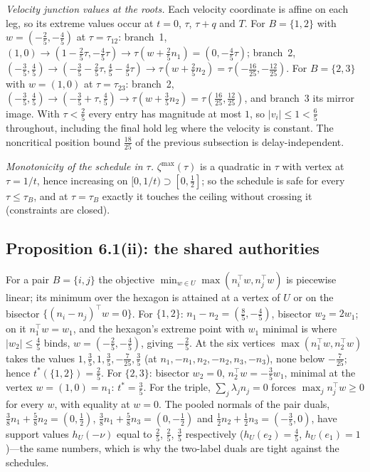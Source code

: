 \documentclass[11pt,a4paper]{article}
\theoremstyle{plain}
\theoremstyle{definition}
\theoremstyle{remark}
\newcommand{\tfr}[2]{\tfrac{#1}{#2}}
\begin{document}
\emph{Velocity junction values at the roots.} Each velocity coordinate is affine on each leg, so its extreme values occur at $t=0$, $\tau$, $\tau+q$ and $T$. For $B=\{1,2\}$ with $w=(-\tfr25,-\tfr45)$ at $\tau=\tau_{12}$: branch~1, $(1,0)\to(1-\tfr25\tau,-\tfr45\tau)\to\tau(w+\tfr25n_1)=(0,-\tfr45\tau)$; branch~2, $(-\tfr35,\tfr45)\to(-\tfr35-\tfr25\tau,\tfr45-\tfr45\tau)\to\tau(w+\tfr25n_2)=\tau(-\tfr{16}{25},-\tfr{12}{25})$. For $B=\{2,3\}$ with $w=(1,0)$ at $\tau=\tau_{23}$: branch~2, $(-\tfr35,\tfr45)\to(-\tfr35+\tau,\tfr45)\to\tau(w+\tfr35n_2)=\tau(\tfr{16}{25},\tfr{12}{25})$, and branch~3 its mirror image. With $\tau<\tfr25$ every entry has magnitude at most $1$, so $|v_i|\le1<\tfr65$ throughout, including the final hold leg where the velocity is constant. The noncritical position bound $\tfr{18}{25}$ of the previous subsection is delay-independent.

\emph{Monotonicity of the schedule in $\tau$.} $\zeta^{\max}(\tau)$ is a quadratic in $\tau$ with vertex at $\tau=1/t$, hence increasing on $[0,1/t)\supset[0,\tfr12]$; so the schedule is safe for every $\tau\le\tau_B$, and at $\tau=\tau_B$ exactly it touches the ceiling without crossing it (constraints are closed).

\subsection{Proposition 6.1(ii): the shared authorities}

For a pair $B=\{i,j\}$ the objective $\min_{w\in U}\max(n_i^\top w,n_j^\top w)$ is piecewise linear; its minimum over the hexagon is attained at a vertex of $U$ or on the bisector $\{(n_i-n_j)^\top w=0\}$. For $\{1,2\}$: $n_1-n_2=(\tfr85,-\tfr45)$, bisector $w_2=2w_1$; on it $n_1^\top w=w_1$, and the hexagon's extreme point with $w_1$ minimal is where $|w_2|\le\tfr45$ binds, $w=(-\tfr25,-\tfr45)$, giving $-\tfr25$. At the six vertices $\max(n_1^\top w,n_2^\top w)$ takes the values $1,\tfr35,1,\tfr35,-\tfr7{25},\tfr35$ (at $n_1,-n_1,n_2,-n_2,n_3,-n_3$), none below $-\tfr7{25}$; hence $t^\ast(\{1,2\})=\tfr25$. For $\{2,3\}$: bisector $w_2=0$, $n_2^\top w=-\tfr35w_1$, minimal at the vertex $w=(1,0)=n_1$: $t^\ast=\tfr35$. For the triple, $\sum_j\lambda_jn_j=0$ forces $\max_jn_j^\top w\ge0$ for every $w$, with equality at $w=0$. The pooled normals of the pair duals, $\tfr38n_1+\tfr58n_2=(0,\tfr12)$, $\tfr38n_1+\tfr58n_3=(0,-\tfr12)$ and $\tfr12n_2+\tfr12n_3=(-\tfr35,0)$, have support values $h_U(-\nu)$ equal to $\tfr25$, $\tfr25$, $\tfr35$ respectively ($h_U(e_2)=\tfr45$, $h_U(e_1)=1$)---the same numbers, which is why the two-label duals are tight against the schedules.
\end{document}
